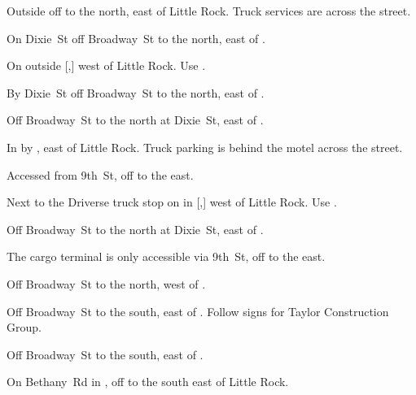 
\begin{LocationList}

Outside  off  to the north, east of Little Rock.
Truck services are across the street.

On Dixie~St off  Broadway~St to the north, east of .

On  outside [,] west of Little Rock.
Use  .

By Dixie~St off  Broadway~St to the north, east of .

Off  Broadway~St to the north at Dixie~St, east of .

\Location{\GasStation \Gas \Rest}
In  by , east of Little Rock.
Truck parking is behind the motel across the street.

Accessed from 9th~St, off  to the east.

Next to the Driverse truck stop on  in [,] west of Little Rock.
Use  .

Off  Broadway~St to the north at Dixie~St, east of .

The cargo terminal is only accessible via 9th~St, off  to the east.

\Location{\RecruitmentAgency \Recruitment}
Off  Broadway~St to the north, west of .

Off  Broadway~St to the south, east of .
Follow signs for Taylor Construction Group.

Off  Broadway~St to the south, east of .

On Bethany~Rd in , off  to the south east of Little Rock.

\end{LocationList}

